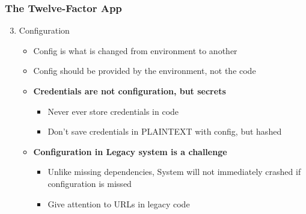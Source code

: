 \documentclass{beamer}
\begin{document}
	\begin{frame}
	\frametitle{The Twelve-Factor App}
		\begin{enumerate}
			\setcounter{enumi}{2}
			\item Configuration
			\begin{itemize}
				\item<1-> Config is what is changed from environment to another
				\item<2-> Config should be provided by the environment, not the code
				
				\vspace{5mm}
				\item<3-> \textbf {Credentials are not configuration, but secrets}
				\begin{itemize}
					\item Never ever store credentials in code
					\item Don't save credentials in PLAINTEXT with config, but hashed
				\end{itemize}
				
				\vspace{5mm}
				\item<4-> \textbf {Configuration in Legacy system is a challenge}
				\begin{itemize}
					\item Unlike missing dependencies, System will not immediately crashed if configuration is missed
					\item Give attention to URLs in legacy code
				\end{itemize}
			\end{itemize}
		\end{enumerate}
	\vspace{30mm}
	\end{frame}
	
\end{document}
